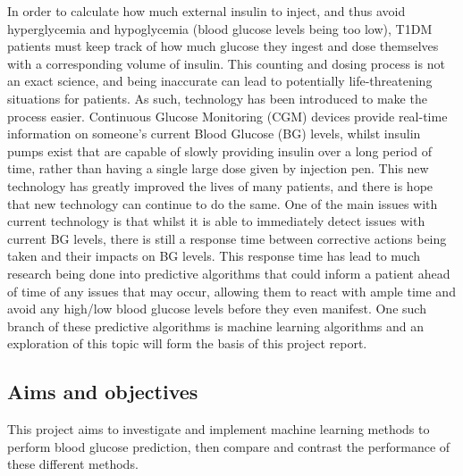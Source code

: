     In order to calculate how much external insulin to inject, and thus avoid hyperglycemia and hypoglycemia (blood glucose levels being too low), T1DM patients must keep track of how much glucose they ingest and dose themselves with a corresponding volume of insulin. This counting and dosing process is not an exact science, and being inaccurate can lead to potentially life-threatening situations for patients. As such, technology has been introduced to make the process easier. Continuous Glucose Monitoring (CGM) devices \cite{pumpcgm} provide real-time information on someone's current Blood Glucose (BG) levels, whilst insulin pumps exist that are capable of slowly providing insulin over a long period of time, rather than having a single large dose given by injection pen. This new technology has greatly improved the lives of many patients, and there is hope that new technology can continue to do the same. One of the main issues with current technology is that whilst it is able to immediately detect issues with current BG levels, there is still a response time between corrective actions being taken and their impacts on BG levels. This response time has lead to much research being done into predictive algorithms that could inform a patient ahead of time of any issues that may occur, allowing them to react with ample time and avoid any high/low blood glucose levels before they even manifest. One such branch of these predictive algorithms is machine learning algorithms and an exploration of this topic will form the basis of this project report.
  
  \subsection{Aims and objectives}
    This project aims to investigate and implement machine learning methods to perform blood glucose prediction, then compare and contrast the performance of these different methods.

